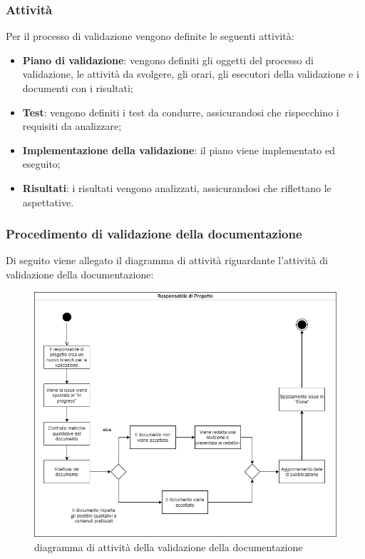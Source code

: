 	\subsubsection{Attività}
	Per il processo di validazione vengono definite le seguenti attività:
	\begin{itemize}
	    \item \textbf{Piano di validazione}: vengono definiti gli oggetti del processo di validazione, le attività da svolgere, gli orari, gli esecutori della validazione e i documenti con i risultati;
	    \item \textbf{Test}: vengono definiti i test da condurre, assicurandosi che rispecchino i requisiti da analizzare;
	    \item \textbf{Implementazione della validazione}: il piano viene implementato ed eseguito;
	    \item \textbf{Risultati}: i risultati vengono analizzati, assicurandosi che riflettano le aspettative.
	\end{itemize}
	
	\subsubsection{Procedimento di validazione della documentazione}
		Di seguito viene allegato il diagramma di attività riguardante l'attività di validazione della documentazione:
		\begin{figure}[hbt!]
	       \centering \includegraphics[width=1.0\textwidth]{_template/images/Validazione.png}
	        \caption{diagramma di attività della validazione della documentazione}
	    \end{figure}